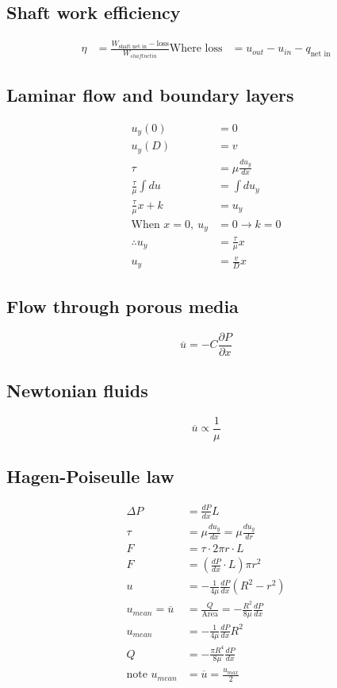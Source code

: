 \subsection{Shaft work efficiency}
\begin{align*}
  \eta                & = \frac{W_{\textrm{shaft net in}} - \textrm{loss}}{W_{shaft net in}}
  \textrm{Where loss} & = u_{out} - u_{in} - q_{\textrm{net in}}
\end{align*}
\subsection{Laminar flow and boundary layers}
\begin{align*}
  u_y(0)                    & = 0                   \\
  u_y(D)                    & = v                   \\
  \tau                      & = \mu \frac{du_y}{dx} \\
  \frac{\tau}{\mu}\int du   & = \int du_y           \\
  \frac{\tau}{\mu}x + k     & = u_y                 \\
  \textrm{When } x=0, \ u_y & = 0 \rightarrow k = 0 \\
  \therefore u_y            & = \frac{\tau}{\mu} x  \\
  u_y                       & = \frac{v}{D} x
\end{align*}
\subsection{Flow through porous media}
\[ \overline{u} = -C \frac{\partial P}{\partial x} \]
\subsection{Newtonian fluids}
\[ \overline{u} \propto \frac{1}{\mu} \]
\subsection{Hagen-Poiseulle law}
\begin{align*}
  \Delta P                & = \frac{dP}{dx} L                                          \\
  \tau                    & = \mu \frac{du_y}{dx} = \mu \frac{du_y}{dr}                \\
  F                       & = \tau \cdot 2\pi r \cdot L                                \\
  F                       & = \left( \frac{dP}{dx} \cdot L \right) \pi r^2             \\
  u                       & = - \frac{1}{4\mu} \frac{dP}{dx}(R^2 - r^2)                \\
  u_{mean} = \overline{u} & = \frac{Q}{\textrm{Area}} = -\frac{R^2}{8\mu}\frac{dP}{dx} \\
  u_{mean}                & = -\frac{1}{4\mu} \frac{dP}{dx} R^2                        \\
  Q                       & = -\frac{\pi R^4}{8\mu}\frac{dP}{dx}                       \\
  \textrm{note } u_{mean} & = \overline{u} = \frac{u_{max}}{2}
\end{align*}
